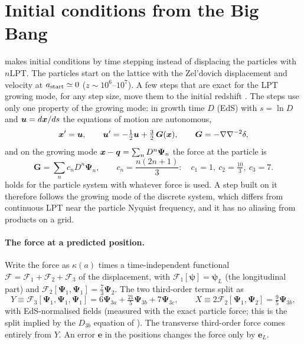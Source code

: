 \section{Initial conditions from the Big Bang}\label{sec:lpt-sfbb}

 makes initial conditions by time stepping instead of displacing the particles with
$n$LPT. The particles start on the lattice with the Zel'dovich displacement and velocity at $a_{\rm start}\simeq0$
($z\sim10^6$--$10^7$). A few steps that are exact for the LPT growing mode, for any step size, move them to the
initial redshift \cite{ListBigBang2024,Rampf2025}. The steps use only one property of the growing mode: in growth time
$D$ (EdS) with $s=\ln D$ and $\bm u = d\bm{x}/ds$ the equations of motion are autonomous,
\begin{equation}
\bm{x}' = \bm u,\qquad \bm u' = -\tfrac12\bm u + \tfrac32\,\bm G(\bm{x}),\qquad \bm G = -\nabla\nabla^{-2}\delta,
\end{equation}
and on the growing mode $\bm{x}-\bm{q} = \sum_n D^n\bm\Psi_n$ the force at the particle is
\begin{equation}
\bm G = \sum_n c_n D^n\bm\Psi_n,\qquad c_n = \frac{n(2n+1)}{3}:\quad c_1=1,\ c_2=\tfrac{10}{3},\ c_3=7 .
\label{eq:lpt-sfbb-cn}
\end{equation}
 holds for the particle system with whatever force is used. A step built on it therefore follows
the growing mode of the discrete system, which differs from continuous LPT near the particle Nyquist frequency, and
it has no aliasing from products on a grid.

\paragraph*{The force at a predicted position.} Write the force as $\kappa(a)$ times a time-independent functional
$\mathcal F = \mathcal F_1+\mathcal F_2+\mathcal F_3$ of the displacement, with $\mathcal F_1[\bm\psi] = \bm\psi_L$ (the
longitudinal part) and $\mathcal F_2[\bm\Psi_1,\bm\Psi_1] = \tfrac73\bm\Psi_2$. The two third-order terms split as
\begin{equation}
Y\equiv\mathcal F_3[\bm\Psi_1,\bm\Psi_1,\bm\Psi_1] = 6\bm\Psi_{3a}+\tfrac{21}{5}\bm\Psi_{3b}+7\bm\Psi_{3c},\qquad
X\equiv 2\mathcal F_2[\bm\Psi_1,\bm\Psi_2] = \tfrac95\bm\Psi_{3b},
\end{equation}
with EdS-normalised fields (measured with the exact particle force; this is the split implied by the $D_{3b}$
equation of ). The transverse third-order force comes entirely from $Y$. An error $\bm e$ in
the positions changes the force only by $\bm e_L$.

